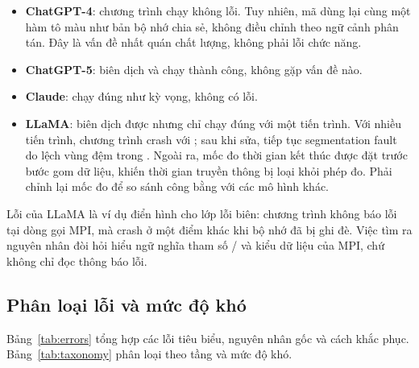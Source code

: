 \begin{itemize}
  \item \textbf{ChatGPT-4}: chương trình chạy không lỗi. Tuy nhiên, mã dùng lại
        cùng một hàm tô màu như bản bộ nhớ chia sẻ, không điều chỉnh theo ngữ
        cảnh phân tán. Đây là vấn đề nhất quán chất lượng, không phải lỗi chức
        năng.
  \item \textbf{ChatGPT-5}: biên dịch và chạy thành công, không gặp vấn đề nào.
  \item \textbf{Claude}: chạy đúng như kỳ vọng, không có lỗi.
  \item \textbf{LLaMA}: biên dịch được nhưng chỉ chạy đúng với một tiến trình. Với
        nhiều tiến trình, chương trình crash với ;
        sau khi sửa, tiếp tục segmentation fault do lệch vùng đệm trong
        . Ngoài ra, mốc đo thời gian kết thúc được đặt trước
        bước gom dữ liệu, khiến thời gian truyền thông bị loại khỏi phép đo. Phải
        chỉnh lại mốc đo để so sánh công bằng với các mô hình khác.
\end{itemize}

Lỗi  của LLaMA là ví dụ điển hình cho lớp lỗi biên: chương
trình không báo lỗi tại dòng gọi MPI, mà crash ở một điểm khác khi bộ nhớ đã bị
ghi đè. Việc tìm ra nguyên nhân đòi hỏi hiểu ngữ nghĩa tham số
/ và kiểu dữ liệu của MPI, chứ không chỉ đọc thông
báo lỗi.

\subsection{Phân loại lỗi và mức độ khó}

Bảng~\ref{tab:errors} tổng hợp các lỗi tiêu biểu, nguyên nhân gốc và cách khắc
phục. Bảng~\ref{tab:taxonomy} phân loại theo tầng và mức độ khó.

